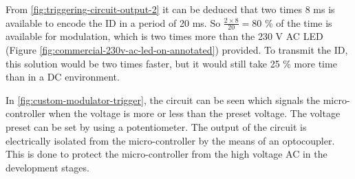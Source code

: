 	From \autoref{fig:triggering-circuit-output-2} it can be deduced that two times 8 ms is available to encode the ID in a period of 20 ms.
	So $\frac{2 \times 8}{20} = 80$ \% of the time is available for modulation, which is two times more than the 230 V AC LED (Figure \autoref{fig:commercial-230v-ac-led-on-annotated}) provided.
	To transmit the ID, this solution would be two times faster, but it would still take 25 \% more time than in a DC environment.



	In \autoref{fig:custom-modulator-trigger}, the circuit can be seen which signals the micro-controller when the voltage is more or less than the preset voltage. 
	The voltage preset can be set by using a potentiometer.
	The output of the circuit is electrically isolated from the micro-controller by the means of an optocoupler.
	This is done to protect the micro-controller from the high voltage AC in the development stages.